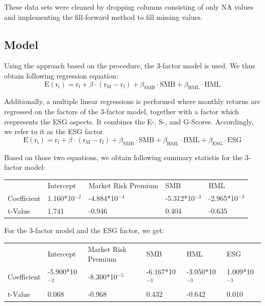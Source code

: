 \documentclass[12pt, a4paper]{article}%
\begin{document}
These data sets were cleaned by dropping columns consisting of only NA values and implementing the fill-forward method to fill missing values.

\subsection{Model}
Using the approach based on the \textcite{FamaFrench1992} procedure, the 3-factor model is used. We thus obtain following regression equation:\\
\begin{equation} \text{E}(\text{r}_{\text{i}}) = \text{r}_{\text{f}} + \beta \cdot (\text{r}_{\text{M}} - \text{r}_{\text{f}}) + \beta_{\text{SMB}} \cdot \text{SMB} + \beta_{\text{HML}} \cdot \text{HML} \end{equation}

Additionally, a multiple linear regressions is performed where monthly returns are regressed on the factors of the 3-factor model, together with a factor which respresents the ESG aspects. It combines the E-, S-, and G-Scores. Accordingly, we refer to it as the ESG factor.\\
\begin{equation} \text{E}(\text{r}_{\text{i}}) = \text{r}_{\text{f}} + \beta \cdot (\text{r}_{\text{M}} - \text{r}_{\text{f}}) + \beta_{\text{SMB}} \cdot \text{SMB} + \beta_{\text{HML}} \cdot \text{HML} + \beta_{\text{ESG}} \cdot \text{ESG} \end{equation}

Based on those two equations, we obtain following summary statistis for the 3-factor model:
\begin{table}[]
    \begin{tabular}{lllll}
                & Intercept                      & Market Risk Premium             & SMB                             & HML                             \\
    Coefficient & 1.160*10$^{-2}$ & -4.884*10$^{-4}$ & -5.312*10$^{-3}$ & -2.965*10$^{-3}$ \\
    t-Value     & 1.741                          & -0.946                          & 0.404                           & -0.635                         
    \end{tabular}
    \end{table}

For the 3-factor model and the ESG factor, we get: \\
\begin{table}[]
    \begin{tabular}{llllll}
                & Intercept                       & Market Risk Premium             & SMB                             & HML                             & ESG                            \\
    Coefficient & -5.900*10$^{-2}$ & -8.300*10$^{-5}$ & -6.167*10$^{-3}$ & -3.050*10$^{-3}$ & 1.009*10$^{-3}$ \\
    t-Value     & 0.068                           & -0.968                          & 0.432                           & -0.642                          & 0.010                         
    \end{tabular}
    \end{table}
\end{document}
